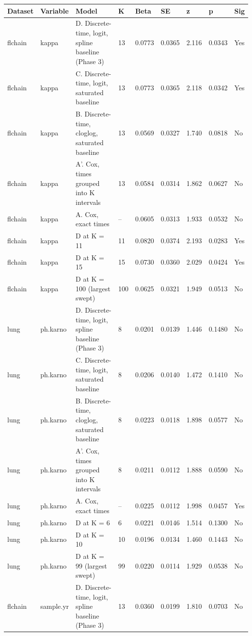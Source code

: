 \begin{tabular}{lllllllll}
  \toprule
Dataset & Variable & Model & K & Beta & SE & z & p & Sig \\ 
  \midrule
flchain & kappa & D. Discrete-time, logit, spline baseline (Phase 3) & 13 & 0.0773 & 0.0365 & 2.116 & 0.0343 & Yes \\ 
  flchain & kappa & C. Discrete-time, logit, saturated baseline & 13 & 0.0773 & 0.0365 & 2.118 & 0.0342 & Yes \\ 
  flchain & kappa & B. Discrete-time, cloglog, saturated baseline & 13 & 0.0569 & 0.0327 & 1.740 & 0.0818 & No \\ 
  flchain & kappa & A'. Cox, times grouped into K intervals & 13 & 0.0584 & 0.0314 & 1.862 & 0.0627 & No \\ 
  flchain & kappa & A. Cox, exact times & -- & 0.0605 & 0.0313 & 1.933 & 0.0532 & No \\ 
  flchain & kappa & D at K = 11 & 11 & 0.0820 & 0.0374 & 2.193 & 0.0283 & Yes \\ 
  flchain & kappa & D at K = 15 & 15 & 0.0730 & 0.0360 & 2.029 & 0.0424 & Yes \\ 
  flchain & kappa & D at K = 100 (largest swept) & 100 & 0.0625 & 0.0321 & 1.949 & 0.0513 & No \\ 
  lung & ph.karno & D. Discrete-time, logit, spline baseline (Phase 3) & 8 & 0.0201 & 0.0139 & 1.446 & 0.1480 & No \\ 
  lung & ph.karno & C. Discrete-time, logit, saturated baseline & 8 & 0.0206 & 0.0140 & 1.472 & 0.1410 & No \\ 
  lung & ph.karno & B. Discrete-time, cloglog, saturated baseline & 8 & 0.0223 & 0.0118 & 1.898 & 0.0577 & No \\ 
  lung & ph.karno & A'. Cox, times grouped into K intervals & 8 & 0.0211 & 0.0112 & 1.888 & 0.0590 & No \\ 
  lung & ph.karno & A. Cox, exact times & -- & 0.0225 & 0.0112 & 1.998 & 0.0457 & Yes \\ 
  lung & ph.karno & D at K = 6 & 6 & 0.0221 & 0.0146 & 1.514 & 0.1300 & No \\ 
  lung & ph.karno & D at K = 10 & 10 & 0.0196 & 0.0134 & 1.460 & 0.1443 & No \\ 
  lung & ph.karno & D at K = 99 (largest swept) & 99 & 0.0220 & 0.0114 & 1.929 & 0.0538 & No \\ 
  flchain & sample.yr & D. Discrete-time, logit, spline baseline (Phase 3) & 13 & 0.0360 & 0.0199 & 1.810 & 0.0703 & No \\ 

\end{tabular}
